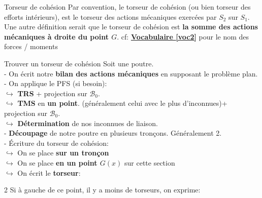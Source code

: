 \documentclass{article}
\begin{document}
{\begin{definition}{Torseur de cohésion}
Par convention, le torseur de cohésion (ou bien torseur des efforts intérieurs), est le torseur des actions mécaniques exercées par $S_2$ sur $S_1$.\\
Une autre définition serait que le torseur de cohésion est \textbf{la somme des actions mécaniques à droite du point $G$}.
cf: \hyperref[voc2]{\textcolor{mypurple}{\textbf{Vocabulaire \ref*{voc2}}}} pour le nom des forces / moments
\end{definition}
\begin{méthode}[label=methodo1]{Trouver un torseur de cohésion}
Soit une poutre.\\
- On écrit notre \textbf{bilan des actions mécaniques} en supposant le problème plan.\\
- On applique le PFS (si besoin):\\
\hspace*{10pt}$\hookrightarrow$ \textbf{TRS} + projection sur $\mathcal{B}_0$.\\
\hspace*{10pt}$\hookrightarrow$ \textbf{TMS} en \textbf{un point}. (généralement celui avec le plus d'inconnues)+ projection sur $\mathcal{B}_0$.\\
\hspace*{10pt}$\hookrightarrow$ \textbf{Détermination} de nos inconnues de liaison.\\
- \textbf{Découpage} de notre poutre en plusieurs tronçons. Généralement 2.\\
- Écriture du torseur de cohésion:\\
\hspace*{10pt}$\hookrightarrow$ On se place \textbf{sur un tronçon}\\
\hspace*{10pt}$\hookrightarrow$ On se place \textbf{en un point $G(x)$} sur cette section\\
\hspace*{10pt}$\hookrightarrow$ On écrit le \textbf{torseur}:\vspace*{-10pt}
\begin{multicols}{2}
Si à gauche de ce point, il y a moins de torseurs, on exprime:

\end{multicols}
\end{méthode}}
\end{document}
